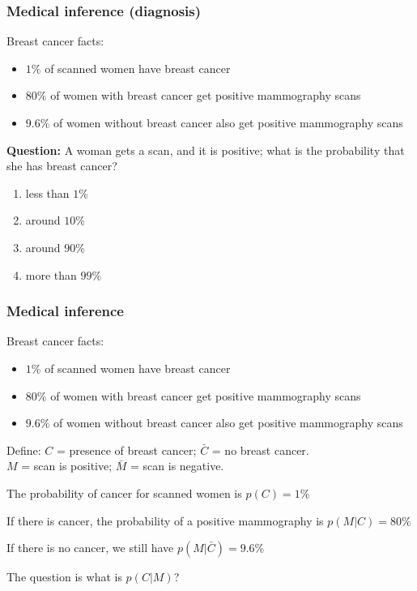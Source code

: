 \begin{frame}
\frametitle{Medical inference (diagnosis)}

Breast cancer facts:
\begin{itemize}
\item $1\%$ of scanned women have breast cancer
\item $80\%$ of women with breast cancer get positive mammography scans
\item $9.6\%$ of women without breast cancer also get positive
  mammography scans
\end{itemize}

{\bf Question:} A woman gets a scan, and it is positive; what is the probability that
she has breast cancer?

\begin{enumerate}
\item less than $1\%$
\item around $10\%$
\item around $90\%$
\item more than $99\%$
\end{enumerate}

\end{frame}
\begin{frame}
\frametitle{Medical inference}

Breast cancer facts:
\begin{itemize}
\item $1\%$ of scanned women have breast cancer
\item $80\%$ of women with breast cancer get positive mammography scans
\item $9.6\%$ of women without breast cancer also get positive
  mammography scans
\end{itemize}

Define: $C$ = presence of breast cancer; $\bar{C}$ = no breast cancer. \\
$M$ = scan is positive; $\bar{M}$ = scan is negative.

The probability of cancer for scanned women is $p(C) = 1\%$

If there is cancer, the probability of a positive mammography
is $p(M|C) = 80\%$

If there is no cancer, we still have $p(M|\bar{C}) = 9.6\%$

The question is what is $p(C|M)$?

\end{frame}
